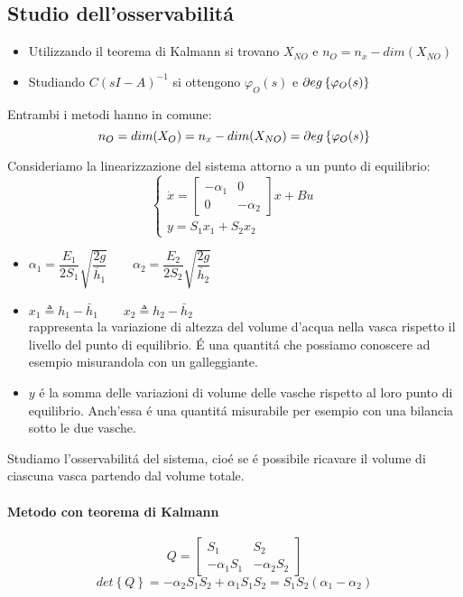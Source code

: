 \documentclass[../main.tex]{subfiles}
\begin{document}
	\subsection{Studio dell'osservabilit\'a}
		\begin{itemize}
			\item 
				Utilizzando il teorema di Kalmann si trovano $ X_{NO} $ e $ n_O = n_x - dim(X_{NO}) $
			\item 
				Studiando $ C(sI-A)^{-1} $ si ottengono $ \varphi_O(s) $ e $ \partial eg \left\lbrace \varphi_O(s) \right\rbrace $
		\end{itemize}
		Entrambi i metodi hanno in comune:
		\[
			n_O = dim(X_O) = n_x - dim(X_{NO}) = \partial eg \left\lbrace \varphi_O(s) \right\rbrace
		\]
		
		\begin{Exercise}[title={Studiare l'osservabilit\'a di due vasche in parallelo}]
			Consideriamo la linearizzazione del sistema attorno a un punto di equilibrio:
			\[
				\begin{cases}
					\dot x=
					\begin{bmatrix}
						-\alpha_1 & 0\\
						0 & -\alpha_2
					\end{bmatrix} x + Bu	
					\\
					y = S_1 x_1 + S_2 x_2
				\end{cases}
			\]
			\begin{itemize}
				\item 
					$ \alpha_1 = \dfrac{E_1}{2S_1} \sqrt{\dfrac{2g}{\bar h_1}} \qquad \alpha_2 = \dfrac{E_2}{2S_2} \sqrt{\dfrac{2g}{\bar h_2}} $ 
				\item 
					$ x_1 \triangleq h_1 - \bar h_1 \qquad x_2 \triangleq h_2 - \bar h_2 $\\
					rappresenta la variazione di altezza del volume d'acqua nella vasca rispetto il livello del punto di equilibrio. \'E una quantit\'a che possiamo conoscere ad esempio misurandola con un galleggiante.
				\item 
					$ y $ \'e la somma delle variazioni di volume delle vasche rispetto al loro punto di equilibrio. Anch'essa \'e una quantit\'a misurabile per esempio con una bilancia sotto le due vasche. 
			\end{itemize}
		
			Studiamo l'osservabilit\'a del sistema, cio\'e se \'e possibile ricavare il volume di ciascuna vasca partendo dal volume totale.
			
			\paragraph{Metodo con teorema di Kalmann}
				\[
					Q =
					\begin{bmatrix}
						S_1 & S_2\\
						-\alpha_1 S_1 & -\alpha_2 S_2
					\end{bmatrix}
				\]
				\[
					det\left\lbrace Q \right\rbrace = -\alpha_2 S_1 S_2 + \alpha_1 S_1 S_2 = S_1 S_2 (\alpha_1 - \alpha_2)
				\]
				

\end{Exercise}
\end{document}
